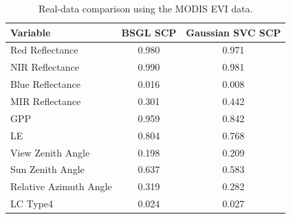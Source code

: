 \begin{table}[!t]
\centering
\caption{Real-data comparison using the MODIS EVI data.}
\label{tab:real_data_gaussian_svc_comparison}
\begin{tabular}{lcc}
\toprule
Variable & BSGL SCP & Gaussian SVC SCP \\
\midrule
Red Reflectance & 0.980 & 0.971 \\
NIR Reflectance & 0.990 & 0.981 \\
Blue Reflectance & 0.016 & 0.008 \\
MIR Reflectance & 0.301 & 0.442 \\
GPP & 0.959 & 0.842 \\
LE & 0.804 & 0.768 \\
View Zenith Angle & 0.198 & 0.209 \\
Sun Zenith Angle & 0.637 & 0.583 \\
Relative Azimuth Angle & 0.319 & 0.282 \\
LC Type4 & 0.024 & 0.027 \\
\bottomrule
\end{tabular}
\end{table}
